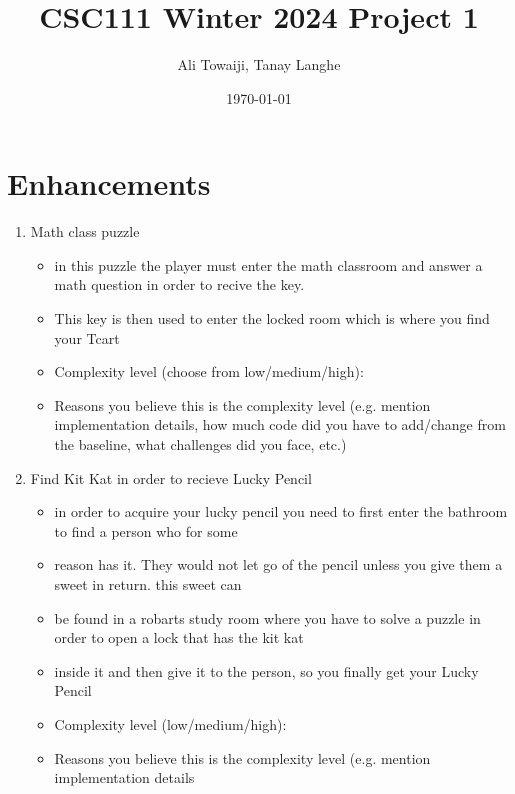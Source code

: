 \documentclass[11pt]{article}
\title{CSC111 Winter 2024 Project 1}
\author{Ali Towaiji, Tanay Langhe}
\date{\today}
\begin{document}
\maketitle

\section*{Enhancements}


\begin{enumerate}

\item Math class puzzle
	\begin{itemize}
	\item in this puzzle the player must enter the math classroom and answer a math question in order to recive the key.
	\item This key is then used to enter the locked room which is where you find your Tcart
	\item Complexity level (choose from low/medium/high):
	\item Reasons you believe this is the complexity level (e.g. mention implementation details, how much code did you have to add/change from the baseline, what challenges did you face, etc.)
	\end{itemize}


\item Find Kit Kat in order to recieve Lucky Pencil
	\begin{itemize}
	\item in order to acquire your lucky pencil you need to first enter the bathroom to find a person who for some
	\item reason has it. They would not let go of the pencil unless you give them a sweet in return. this sweet can
	\item be found in a robarts study room where you have to solve a puzzle in order to open a lock that has the kit kat
	\item inside it and then give it to the person, so you finally get your Lucky Pencil
	\item Complexity level (low/medium/high):
	\item Reasons you believe this is the complexity level (e.g. mention implementation details
	\end{itemize}


\end{enumerate}
\end{document}
